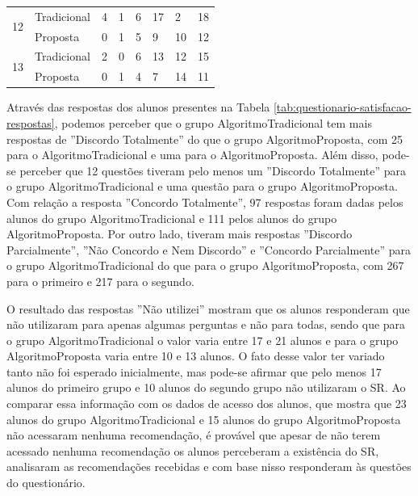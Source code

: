 \begin{table}[h]
\begin{tabular}{|p{1.5cm}|p{1.8cm}|p{2.2cm}|p{0.6cm}|p{0.6cm}|p{0.6cm}|p{2.3cm}|p{2cm}|}
\hline
\multirow{2}{*}{12}         & Tradicional & 4                   & 1                     & 6                         & 17                    & 2                   & 18           \\
                            & Proposta    & 0                   & 1                     & 5                         & 9                     & 10                  & 12           \\
\hline
\multirow{2}{*}{13}         & Tradicional & 2                   & 0                     & 6                         & 13                    & 12                  & 15           \\
                            & Proposta    & 0                   & 1                     & 4                         & 7                     & 14                  & 11           \\
\hline
\end{tabular}
\end{table}

Através das respostas dos alunos presentes na Tabela \ref{tab:questionario-satisfacao-respostas}, podemos perceber que
o grupo AlgoritmoTradicional tem mais respostas de ''Discordo Totalmente'' do
que o grupo AlgoritmoProposta, com 25 para o AlgoritmoTradicional e uma para o AlgoritmoProposta.
Além disso, pode-se perceber que 12 questões tiveram pelo menos um ''Discordo Totalmente'' para o grupo AlgoritmoTradicional
e uma questão para o grupo AlgoritmoProposta. Com relação a resposta ''Concordo Totalmente'',
97 respostas foram dadas pelos alunos do grupo AlgoritmoTradicional e 111
pelos alunos do grupo AlgoritmoProposta. Por outro lado, tiveram mais respostas ''Discordo Parcialmente'',
''Não Concordo e Nem Discordo'' e ''Concordo Parcialmente'' para o grupo AlgoritmoTradicional do que para o grupo
AlgoritmoProposta, com 267 para o primeiro e 217 para o segundo.

O resultado das respostas ''Não utilizei'' mostram que os alunos responderam que não utilizaram para apenas algumas
perguntas e não para todas, sendo que para o grupo AlgoritmoTradicional o valor varia entre 17 e 21 alunos e para o grupo
AlgoritmoProposta varia entre 10 e 13 alunos. O fato desse valor ter variado tanto não foi esperado inicialmente, mas pode-se
afirmar que pelo menos 17 alunos do primeiro grupo e 10 alunos do segundo grupo não utilizaram o SR. Ao comparar essa
informação com os dados de acesso dos alunos, que mostra que 23 alunos do grupo AlgoritmoTradicional e 15 alunos do
grupo AlgoritmoProposta não acessaram nenhuma recomendação, é provável que apesar de não terem acessado nenhuma recomendação os
alunos perceberam a existência do SR, analisaram as recomendações recebidas e com base nisso responderam às questões do
questionário.

